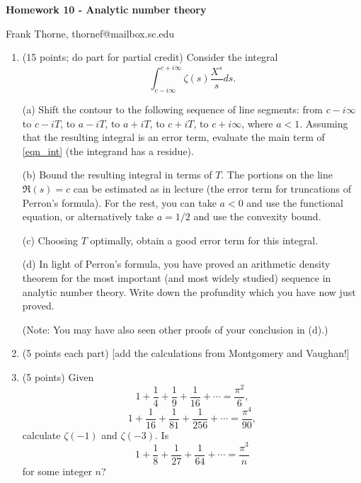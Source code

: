 \documentclass[12pt]{article}
\begin{document}
\setlength{\topmargin}{-2mm}





\begin{center}{\bf Homework 10 - Analytic number theory}
\end{center}
\begin{center}Frank Thorne, thornef@mailbox.sc.edu
\end{center}
\begin{enumerate}
\item (15 points; do part for partial credit)
Consider the integral
\begin{equation}\label{eqn_int}
\int_{c - i \infty}^{c + i \infty} \zeta(s) \frac{X^s}{s} ds.
\end{equation}

(a) Shift the contour to the following sequence of line segments: from $c - i \infty$ to
$c - i T$, to $a - i T$, to $a + iT$, to $c + iT$, to $c + i \infty$, where $a < 1$.
Assuming that the resulting integral is an error term, evaluate the main term of \eqref{eqn_int}
(the integrand has a residue).

(b) Bound the resulting integral in terms of $T$. The portions on the line $\Re(s) = c$
can be estimated as in lecture (the error term for truncations of Perron's formula).
For the rest, you can take $a < 0$ and use the functional equation, or alternatively take
$a = 1/2$ and use the convexity bound.

(c) Choosing $T$ optimally, obtain a good error term for this integral.

(d) In light of Perron's formula, you have proved an arithmetic density theorem
for the most important (and most widely studied) sequence in analytic number theory.
Write down the profundity which you have now just proved.

(Note: You may have also seen other proofs of your conclusion in (d).)

\item (5 points each part)
[add the calculations from Montgomery and Vaughan!]

\item (5 points)
Given
\begin{equation}
1 + \frac{1}{4} + \frac{1}{9} + \frac{1}{16} + \cdots = \frac{\pi^2}{6},
\end{equation}
\begin{equation}
1 + \frac{1}{16} + \frac{1}{81} + \frac{1}{256} + \cdots = \frac{\pi^4}{90},
\end{equation}
calculate $\zeta(-1)$ and $\zeta(-3)$. Is
\begin{equation}
1 + \frac{1}{8} + \frac{1}{27} + \frac{1}{64} + \cdots = \frac{\pi^3}{n}
\end{equation}
for some integer $n$?


\end{enumerate}
\end{document}
